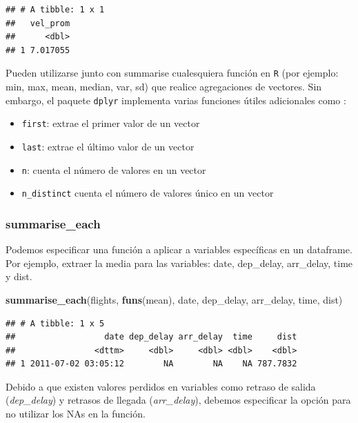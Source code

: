 \documentclass[]{article}
\newenvironment{Shaded}{\begin{snugshade}}{\end{snugshade}}
\newcommand{\KeywordTok}[1]{\textcolor[rgb]{0.13,0.29,0.53}{\textbf{#1}}}
\newcommand{\NormalTok}[1]{#1}
\begin{document}
\begin{verbatim}
## # A tibble: 1 x 1
##   vel_prom
##      <dbl>
## 1 7.017055
\end{verbatim}

\begin{curiosidad}
Pueden utilizarse junto con summarise cualesquiera función en \texttt{R} 
(por ejemplo: min, max, mean, median, var, sd) que
realice agregaciones de vectores. Sin embargo, el paquete \texttt{dplyr} implementa
varias funciones útiles adicionales como \parencite{datawrangling}: \\

\begin{itemize}
\item \texttt{first}: extrae el primer valor de un vector
\item \texttt{last}: extrae el último valor de un vector
\item \texttt{n}: cuenta el número de valores en un vector
\item \texttt{n\_distinct} cuenta el número de valores único en un vector
\end{itemize}
\end{curiosidad}

\subsubsection{summarise\_each}\label{summarise_each}

Podemos especificar una función a aplicar a variables específicas en un
dataframe. Por ejemplo, extraer la media para las variables: date,
dep\_delay, arr\_delay, time y dist.

\begin{Shaded}
\begin{Highlighting}[]
\KeywordTok{summarise_each}\NormalTok{(flights, }\KeywordTok{funs}\NormalTok{(mean), date, dep_delay, arr_delay, time, dist)}
\end{Highlighting}
\end{Shaded}

\begin{verbatim}
## # A tibble: 1 x 5
##                  date dep_delay arr_delay  time     dist
##                <dttm>     <dbl>     <dbl> <dbl>    <dbl>
## 1 2011-07-02 03:05:12        NA        NA    NA 787.7832
\end{verbatim}

Debido a que existen valores perdidos en variables como retraso de
salida (\emph{dep\_delay}) y retrasos de llegada (\emph{arr\_delay}),
debemos especificar la opción para no utilizar los NAs en la función.
\end{document}
